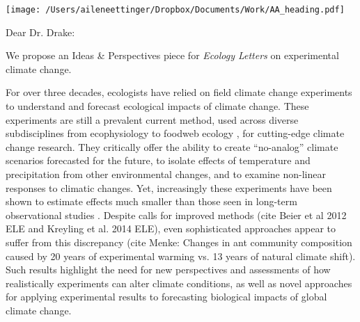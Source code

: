 \documentclass[11pt,a4paper]{letter}
\begin{document}


\begin{letter}{}
\texttt{[image: /Users/aileneettinger/Dropbox/Documents/Work/AA\_heading.pdf]}

\opening{Dear Dr. Drake:}
We propose an Ideas \& Perspectives piece for \emph{Ecology Letters} on experimental climate change. 

For over three decades, ecologists have relied on field climate change experiments to understand and forecast ecological impacts of climate change. These experiments are still a prevalent current method, used across diverse subdisciplines from ecophysiology \citep{reich2015} to foodweb ecology \citep{barton2009}, for cutting-edge climate change research. They critically offer the ability to create ``no-analog'' climate scenarios forecasted for the future, to isolate effects of temperature and precipitation from other environmental changes, and to examine non-linear responses to climatic changes. Yet, increasingly these experiments have been shown to estimate effects much smaller than those seen in long-term observational studies \citep{wolkovich12}. Despite calls for improved methods (cite Beier et al 2012 ELE and Kreyling et al. 2014 ELE), even sophisticated approaches appear to suffer from this discrepancy (cite Menke: Changes in ant community composition caused by 20 years of experimental warming vs. 13 years of natural climate shift). Such results highlight the need for new perspectives and assessments of how realistically experiments can alter climate conditions, as well as novel approaches for applying experimental results to forecasting biological impacts of global climate change. 


\end{letter}
\end{document}
